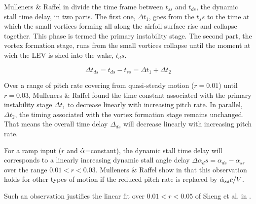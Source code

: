 Mulleners \& Raffel in \cite{mulleners_onset_2010} divide the time frame between $t_{ss}$ and $t_{ds}$, the dynamic stall time delay, in two parts. The first one, $\Delta t_1$, goes from the $t_ss$ to the time at which the small vortices forming all along the airfoil surface rise and collapse together. This phase is termed the primary instability stage. The second part, the vortex formation stage, runs from the small vortices collapse until the moment at wich the LEV is shed into the wake, $t_ds$.

\begin{equation}
\Delta t_{ds} = t_{ds} - t_{ss}  = \Delta t_1 + \Delta t_2
\end{equation}

Over a range of pitch rate covering from quasi-steady motion ($r=0.01$) until $r=0.03$, Mulleners \& Raffel \cite{mulleners_onset_2010,mulleners_onset_2012,mulleners_dynamic_2013} found the time constant associated with the primary instability stage $\Delta t_1$ to decrease linearly with increasing pitch rate. In parallel, $\Delta t_2$, the timing associated with the vortex formation stage remains unchanged. That means the overall time delay $\Delta _{ds}$ will decrease linearly with increasing pitch rate. 

For a ramp input ($r$ and $\dot{\alpha}$=constant), the dynamic stall time delay will corresponds to a linearly increasing dynamic stall angle delay $\Delta \alpha_ds = \alpha_{ds} - \alpha_{ss}$ over the range $0.01<r<0.03$. Mulleners \& Raffel show in \cite{mulleners_onset_2012} that this observation holds for other types of motion if the reduced pitch rate is replaced by $\dot{\alpha}_{ss} c /V$.

Such an observation justifies the linear fit over $0.01<r<0.05$ of Sheng et al. in \cite{sheng_new_2006}.

